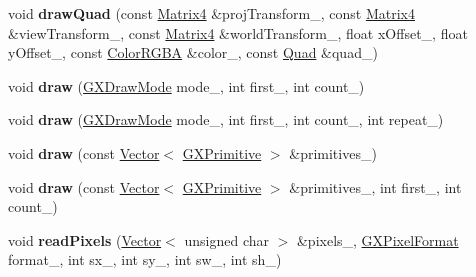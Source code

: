 \begin{DoxyCompactItemize}
\item 
void {\bfseries draw\+Quad} (const \hyperlink{class_magnum_1_1_matrix4}{Matrix4} \&proj\+Transform\+\_\+, const \hyperlink{class_magnum_1_1_matrix4}{Matrix4} \&view\+Transform\+\_\+, const \hyperlink{class_magnum_1_1_matrix4}{Matrix4} \&world\+Transform\+\_\+, float x\+Offset\+\_\+, float y\+Offset\+\_\+, const \hyperlink{class_magnum_1_1_color_r_g_b_a}{Color\+R\+G\+BA} \&color\+\_\+, const \hyperlink{class_magnum_1_1_g_x_context_1_1_quad}{Quad} \&quad\+\_\+)\hypertarget{class_magnum_1_1_g_x_context_a04056dba5fcc5f91fb04f8c5e4b26cf3}{}\label{class_magnum_1_1_g_x_context_a04056dba5fcc5f91fb04f8c5e4b26cf3}

\item 
void {\bfseries draw} (\hyperlink{class_magnum_1_1_g_x_draw_mode}{G\+X\+Draw\+Mode} mode\+\_\+, int first\+\_\+, int count\+\_\+)\hypertarget{class_magnum_1_1_g_x_context_ae27d95e3c25caf09b3d131d2597bfd90}{}\label{class_magnum_1_1_g_x_context_ae27d95e3c25caf09b3d131d2597bfd90}

\item 
void {\bfseries draw} (\hyperlink{class_magnum_1_1_g_x_draw_mode}{G\+X\+Draw\+Mode} mode\+\_\+, int first\+\_\+, int count\+\_\+, int repeat\+\_\+)\hypertarget{class_magnum_1_1_g_x_context_a14ca0a530488d8512039d181580aed58}{}\label{class_magnum_1_1_g_x_context_a14ca0a530488d8512039d181580aed58}

\item 
void {\bfseries draw} (const \hyperlink{class_magnum_1_1_vector}{Vector}$<$ \hyperlink{class_magnum_1_1_g_x_primitive}{G\+X\+Primitive} $>$ \&primitives\+\_\+)\hypertarget{class_magnum_1_1_g_x_context_aae81ab3576f73498f1f883746cfe3fb8}{}\label{class_magnum_1_1_g_x_context_aae81ab3576f73498f1f883746cfe3fb8}

\item 
void {\bfseries draw} (const \hyperlink{class_magnum_1_1_vector}{Vector}$<$ \hyperlink{class_magnum_1_1_g_x_primitive}{G\+X\+Primitive} $>$ \&primitives\+\_\+, int first\+\_\+, int count\+\_\+)\hypertarget{class_magnum_1_1_g_x_context_a622043bce177941e13e36c8184a15631}{}\label{class_magnum_1_1_g_x_context_a622043bce177941e13e36c8184a15631}

\item 
void {\bfseries read\+Pixels} (\hyperlink{class_magnum_1_1_vector}{Vector}$<$ unsigned char $>$ \&pixels\+\_\+, \hyperlink{class_magnum_1_1_g_x_pixel_format}{G\+X\+Pixel\+Format} format\+\_\+, int sx\+\_\+, int sy\+\_\+, int sw\+\_\+, int sh\+\_\+)\hypertarget{class_magnum_1_1_g_x_context_a183d1df7d5f46612d76f894124b449c1}{}\label{class_magnum_1_1_g_x_context_a183d1df7d5f46612d76f894124b449c1}


\end{DoxyCompactItemize}
